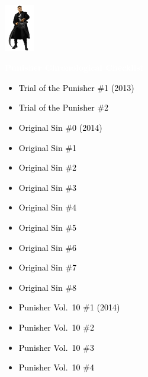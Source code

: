 \documentclass[12pt]{article}
\newcommand{\checkbox}{\raisebox{0.0ex}{\fbox{\rule{0ex}{1.5ex} \rule{1.5ex}{0ex}}}}
\begin{document}
\begin{center}
    \vspace*{2cm}
    \includegraphics[width=0.1\textwidth]{PUNISHER1.PNG}
    \vspace{0.3cm}

    {\Huge \textbf{\textcolor{white}{Punisher Chronological Checklist}}}
\end{center}

\vspace{0.3cm}
\noindent
\begin{tcolorbox}[
  colback=white!95!gray,
  colframe=black,
  width=\textwidth,
  arc=4mm,
  auto outer arc,
  boxrule=0.8pt,
  left=8pt,right=8pt,top=8pt,bottom=8pt
]
\begin{itemize}[left=0pt,label={\checkbox}]
    \item \textcolor{black}{Trial of the Punisher \#1 (2013)}
    \item \textcolor{black}{Trial of the Punisher \#2}
    \item \textcolor{black}{Original Sin \#0 (2014)}
    \item \textcolor{black}{Original Sin \#1}
    \item \textcolor{black}{Original Sin \#2}
    \item \textcolor{black}{Original Sin \#3}
    \item \textcolor{black}{Original Sin \#4}
    \item \textcolor{black}{Original Sin \#5}
    \item \textcolor{black}{Original Sin \#6}
    \item \textcolor{black}{Original Sin \#7}
    \item \textcolor{black}{Original Sin \#8}
    \item \textcolor{black}{Punisher Vol.\ 10 \#1 (2014)}
    \item \textcolor{black}{Punisher Vol.\ 10 \#2}
    \item \textcolor{black}{Punisher Vol.\ 10 \#3}
    \item \textcolor{black}{Punisher Vol.\ 10 \#4}
\end{itemize}
\end{tcolorbox}
\end{document}
